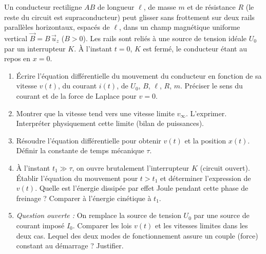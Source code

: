 \documentclass[11pt]{article}
\begin{document}
\begin{exercice}
Un conducteur rectiligne $AB$ de longueur $\ell$, de masse $m$ et de résistance $R$ (le reste du circuit est supraconducteur) peut glisser sans frottement sur deux rails parallèles horizontaux, espacés de $\ell$, dans un champ magnétique uniforme vertical $\vec{B}=B\,\vec{u}_z$ ($B>0$). Les rails sont reliés à une source de tension idéale $U_0$ par un interrupteur $K$. À l'instant $t=0$, $K$ est fermé, le conducteur étant au repos en $x=0$.
\begin{enumerate}
    \item Écrire l'équation différentielle du mouvement du conducteur en fonction de sa vitesse $v(t)$, du courant $i(t)$, de $U_0$, $B$, $\ell$, $R$, $m$. Préciser le sens du courant et de la force de Laplace pour $v=0$.
    \item Montrer que la vitesse tend vers une vitesse limite $v_\infty$. L'exprimer. Interpréter physiquement cette limite (bilan de puissances).
    \item Résoudre l'équation différentielle pour obtenir $v(t)$ et la position $x(t)$. Définir la constante de temps mécanique $\tau$.
    \item À l'instant $t_1 \gg \tau$, on ouvre brutalement l'interrupteur $K$ (circuit ouvert). Établir l'équation du mouvement pour $t > t_1$ et déterminer l'expression de $v(t)$. Quelle est l'énergie dissipée par effet Joule pendant cette phase de freinage ? Comparer à l'énergie cinétique à $t_1$.
    \item \textit{Question ouverte :} On remplace la source de tension $U_0$ par une source de courant imposé $I_0$. Comparer les lois $v(t)$ et les vitesses limites dans les deux cas. Lequel des deux modes de fonctionnement assure un couple (force) constant au démarrage ? Justifier.
\end{enumerate}
\end{exercice}
\end{document}
